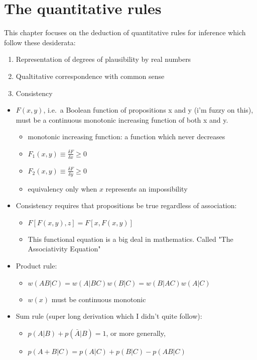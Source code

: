 \documentclass[../jaynes_prob_theory_notes.tex]{subfiles}
\begin{document}
\section{The quantitative rules}
This chapter focuses on the deduction of quantitative rules for inference which follow these desiderata:
    \begin{enumerate}
        \item Representation of degrees of plausibility by real numbers
        \item Qualtitative correspondence with common sense
        \item Consistency
    \end{enumerate}

\begin{itemize}
    \item $F(x,y)$, i.e.\ a Boolean function of propositions x and y (i'm fuzzy on this), must be a continuous monotonic increasing function of both x and y. 
        \begin{itemize}
            \item monotonic increasing function: a function which never decreases
            \item $F_1(x,y) \equiv \frac{\delta F}{\delta x} \geq 0$
            \item $F_2(x,y) \equiv \frac{\delta F}{\delta y} \geq 0$
            \item equivalency only when $x$ represents an impossibility
        \end{itemize}
  
    \item Consistency requires that propositions be true regardless of association:
        \begin{itemize}
            \item $F[F(x,y),z] = F[x,F(x,y)]$
            \item This functional equation is a big deal in mathematics. Called "The Associativity Equation"
        \end{itemize}

    \item Product rule:
        \begin{itemize}
            \item[] $w(AB|C) = w(A|BC)w(B|C) = w(B|AC)w(A|C)$
            \item $w(x)$ must be continuous monotonic
        \end{itemize}

    \item Sum rule (super long derivation which I didn't quite follow):
        \begin{itemize}
            \item[] $p(A|B) + p(\bar{A}|B) = 1$, or more generally,
            \item[] $p(A + B|C) = p(A|C) + p(B|C) - p(AB|C)$
        \end{itemize}
  

\end{itemize}
\end{document}
